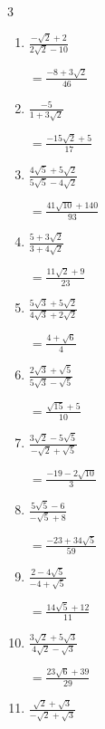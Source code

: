 \begin{multicols}{3}
\begin{enumerate}
  \item $\displaystyle \frac{-\sqrt{2}+2}{2\sqrt{2}-10}$

        $\displaystyle =\frac{-8+3\sqrt{2}}{46}$

  \item $\displaystyle \frac{-5}{1+3\sqrt{2}}$

        $\displaystyle =\frac{-15\sqrt{2}+5}{17}$

  \item $\displaystyle \frac{4\sqrt{5}+5\sqrt{2}}{5\sqrt{5}-4\sqrt{2}}$

        $\displaystyle =\frac{41\sqrt{10}+140}{93}$

  \item $\displaystyle \frac{5+3\sqrt{2}}{3+4\sqrt{2}}$

        $\displaystyle =\frac{11\sqrt{2}+9}{23}$

\columnbreak %

\resetques

  \item $\displaystyle \frac{5\sqrt{3}+5\sqrt{2}}{4\sqrt{3}+2\sqrt{2}}$

        $\displaystyle =\frac{4+\sqrt{6}}{4}$

  \item $\displaystyle \frac{2\sqrt{3}+\sqrt{5}}{5\sqrt{3}-\sqrt{5}}$

        $\displaystyle =\frac{\sqrt{15}+5}{10}$

  \item $\displaystyle \frac{3\sqrt{2}-5\sqrt{5}}{-\sqrt{2}+\sqrt{5}}$

        $\displaystyle =\frac{-19-2\sqrt{10}}{3}$

  \item $\displaystyle \frac{5\sqrt{5}-6}{-\sqrt{5}+8}$

        $\displaystyle =\frac{-23+34\sqrt{5}}{59}$

  \item $\displaystyle \frac{2-4\sqrt{5}}{-4+\sqrt{5}}$

        $\displaystyle =\frac{14\sqrt{5}+12}{11}$

\columnbreak %

  \item $\displaystyle \frac{3\sqrt{2}+5\sqrt{3}}{4\sqrt{2}-\sqrt{3}}$

        $\displaystyle =\frac{23\sqrt{6}+39}{29}$

  \item $\displaystyle \frac{\sqrt{2}+\sqrt{3}}{-\sqrt{2}+\sqrt{3}}$


\end{enumerate}
\end{multicols}
